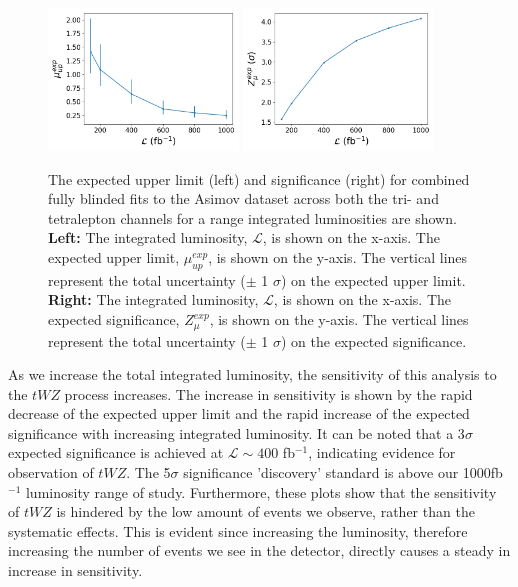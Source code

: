 \begin{figure}[h!]
    \centering
    \includegraphics[width=0.45\textwidth]{figures/combined/exp_upper.png}
    \includegraphics[width=0.45\textwidth]{figures/combined/signif.png}
    \caption{The expected upper limit (left) and significance (right) for combined fully blinded fits to the Asimov dataset across both the tri- and tetralepton channels for a range integrated luminosities are shown. \textbf{Left: }The integrated luminosity, $\mathcal{L}$, is shown on the x-axis. The expected upper limit, $\mu_{up}^{exp}$, is shown on the y-axis. The vertical lines represent the total uncertainty ($\pm$ 1 $\sigma$) on the expected upper limit. \textbf{Right: }The integrated luminosity, $\mathcal{L}$, is shown on the x-axis. The expected significance, $Z_{\mu}^{exp}$, is shown on the y-axis. The vertical lines represent the total uncertainty ($\pm$ 1 $\sigma$) on the expected significance.}
    \label{fig:limit-sig-projection}
\end{figure}As we increase the total integrated luminosity, the sensitivity of this analysis to the $tWZ$ process increases. The increase in sensitivity is shown by the rapid decrease of the expected upper limit and the rapid increase of the expected significance with increasing integrated luminosity. It can be noted that a 3$\sigma$ expected significance is achieved at $\mathcal{L} \sim 400$ fb$^{-1}$, indicating evidence for observation of $tWZ$. The 5$\sigma$ significance 'discovery' standard is above our 1000fb$^{-1}$ luminosity range of study. Furthermore, these plots show that the sensitivity of $tWZ$ is hindered by the low amount of events we observe, rather than the systematic effects. This is evident since increasing the luminosity, therefore increasing the number of events we see in the detector, directly causes a steady in increase in sensitivity.

